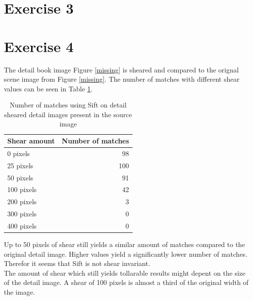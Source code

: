 \documentclass[11pt,a4paper]{article}
\begin{document}
\section*{Exercise 3}

\section*{Exercise 4}
The detail book image Figure \ref{missing} is sheared and compared to the orignal scene image from Figure \ref{missing}.
The number of matches with different shear values can be seen in Table \ref{tab:sheared}.
\begin{table}[H]
	\centering
	\begin{tabular}{l|r}
		Shear amount  & Number of matches\\
		\hline
		0 pixels & 98\\
		25 pixels & 100\\
		50 pixels & 91\\
		100 pixels & 42\\
		200 pixels & 3\\
		300 pixels & 0\\
		400 pixels & 0
	\end{tabular}
	\caption{Number of matches using Sift on detail sheared detail images present in the source image}
	\label{tab:sheared}
\end{table}
\noindent Up to 50 pixels of shear still yields a similar amount of matches compared to the original detail image.
Higher values yield a significantly lower number of matches. Therefor it seems that Sift is not shear invariant.\\

\noindent The amount of shear which still yields tollarable results might depent on the size of the detail image. A shear of 100 pixels is almost a third of the original width of the image.

\end{document}
